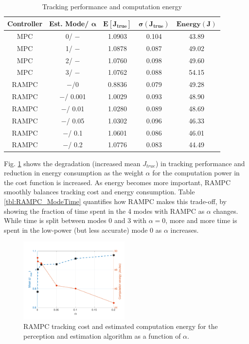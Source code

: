 \begin{table}[htb]
\begin{center}
\caption{Tracking performance and computation energy}
\label{tbl:RAMPC_MPC_performance}
\begin{tabular} {|c|c|c|c|c|}
	\hline
	\textbf{Controller} &\textbf{Est. Mode}/ $\pmb{\alpha}$ & $\pmb{E[J_{true}]}$ & $\pmb{\sigma({J_{true}})}$ & $\pmb{Energy(J)}$ \\ \hline
	MPC & 0/ $-$ & 1.0903 & 0.104 & 43.89\\ \hline
	MPC & 1/ $-$ & 1.0878 & 0.087 & 49.02 \\ \hline
	MPC & 2/ $-$ & 1.0760 & 0.098 & 49.60 \\ \hline
	MPC & 3/ $-$ & 1.0762 & 0.088 & 54.15 \\ \hline
	RAMPC &  $-$/0 & 0.8836 & 0.079 & 49.28 \\ \hline
	RAMPC & $-$/ 0.001 & 1.0029 & 0.093 & 48.90  \\ \hline
	RAMPC & $-$/ 0.01 & 1.0280 & 0.089 & 48.69  \\ \hline
	RAMPC & $-$/ 0.05 &1.0302 & 0.096 & 46.33 \\ \hline
	RAMPC & $-$/ 0.1 &1.0601 & 0.086 & 46.01 \\ \hline
	RAMPC & $-$/ 0.2 & 1.0776 & 0.083 & 44.49 \\ \hline
\end{tabular}	
	\end{center}
\end{table}


Fig. \ref{fig:CostAndEnergyVsAlpha} shows the degradation (increased mean $J_{true}$) in tracking performance and reduction in energy consumption as the weight $\alpha$ for the computation power in the cost function is increased. As energy becomes more important, RAMPC smoothly balances tracking cost and energy consumption. Table \ref{tbl:RAMPC_ModeTime} quantifies how RAMPC makes this trade-off, by showing the fraction of time spent in the 4 modes with RAMPC as $\alpha$ changes. While time is split between modes 0 and 3 with $\alpha=0$, more and more time is spent in the low-power (but less accurate) mode 0 as $\alpha$ increases.


\begin{figure}[tb]
	\centering
	\includegraphics[width=0.49\textwidth,scale=0.7]{figures/CostAndEnergyVsAlpha}
        \vspace{-20pt}
	\caption{RAMPC tracking cost and estimated computation energy for the perception and estimation algorithm as a function of $\alpha$. }
	\label{fig:CostAndEnergyVsAlpha}
\end{figure}


